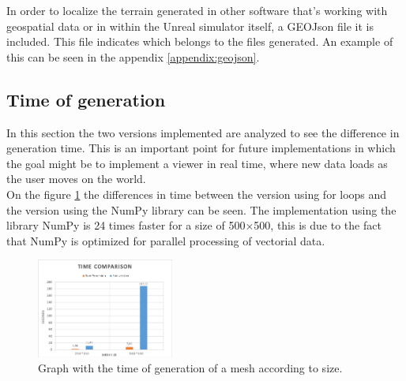 \documentclass[10pt,a4paper,twocolumn,twoside]{article}
\begin{document}
In order to localize the terrain generated in other software that's working with geospatial data or in within the Unreal simulator itself, a GEOJson file it is included. This file indicates which belongs to the files generated. An example of this can be seen in the appendix \ref{appendix:geojson}.

\subsection{Time of generation}
In this section the two versions implemented are analyzed to see the difference in generation time. This is an important point for future implementations in which the goal might be to implement a viewer in real time, where new data loads as the user moves on the world.
\\
On the figure \ref{fig-meshtime} the differences in time between the version using for loops and the version using the NumPy library can be seen. The implementation using the library NumPy is 24 times faster for a size of 500$\times$500, this is due to the fact that NumPy is optimized for parallel processing of vectorial data.

\begin{figure}[!h]
\centering
  	\includegraphics[width=0.4\textwidth]{meshtime}
	\caption{Graph with the time of generation of a mesh according to size.}
	\label{fig-meshtime}
\end{figure}
\end{document}
